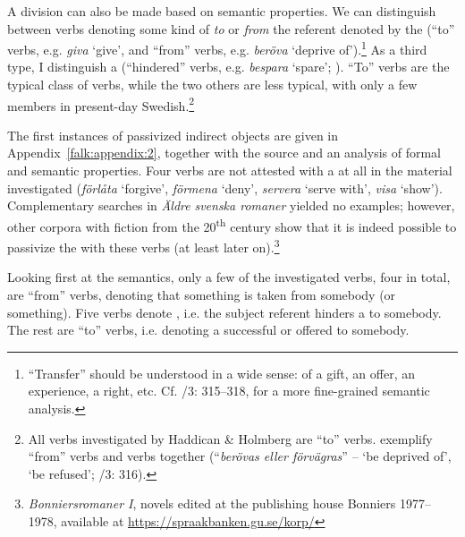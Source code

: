 \documentclass[output=paper]{langscibook}
\begin{document}
A division can also be made based on semantic properties. We can distinguish between  verbs denoting some kind of  \textit{to} or  \textit{from} the referent denoted by the  (“to” verbs, e.g. \textit{giva} ‘give’, and “from” verbs, e.g. \textit{beröva} ‘deprive of’).\footnote{“Transfer” should be understood in a wide sense:  of a gift, an offer, an experience, a right, etc. Cf. \citealt{TelemanEtAl1999}/3: 315–318, \citet{Valdeson2021} for a more fine-grained semantic analysis.} As a third type, I distinguish a  (“hindered” verbs, e.g. \textit{bespara} ‘spare’; \citealt{Valdeson2021}). “To” verbs are the typical class of  verbs, while the two others are less typical, with only a few members in present-day Swedish.\footnote{All verbs investigated by Haddican \& Holmberg are “to” verbs. \citet{TelemanEtAl1999} exemplify “from” verbs and  verbs together (“\textit{berövas eller förvägras}” – ‘be deprived of’, ‘be refused’; \citealt{TelemanEtAl1999}/3: 316).} 



The first instances of passivized indirect objects are given in Appendix~\ref{falk:appendix:2}, together with the source and an analysis of formal and semantic properties. Four verbs are not attested with a  at all in the material investigated (\textit{förlåta} ‘forgive’, \textit{förmena} ‘deny’, \textit{servera} ‘serve with’, \textit{visa} ‘show’). Complementary searches in \textit{Äldre} \textit{svenska romaner} yielded no examples; however, other corpora with fiction from the 20\textsuperscript{th} century show that it is indeed possible to passivize the  with these verbs (at least later on).\footnote{\textit{Bonniersromaner I}, novels edited at the publishing house Bonniers 1977–1978, available at \url{https://spraakbanken.gu.se/korp/}} 



Looking first at the semantics, only a few of the investigated verbs, four in total, are “from” verbs, denoting that something is taken from somebody (or something). Five verbs denote , i.e. the subject referent hinders a  to somebody. The rest are “to” verbs, i.e. denoting a successful or offered  to somebody. 
\end{document}
